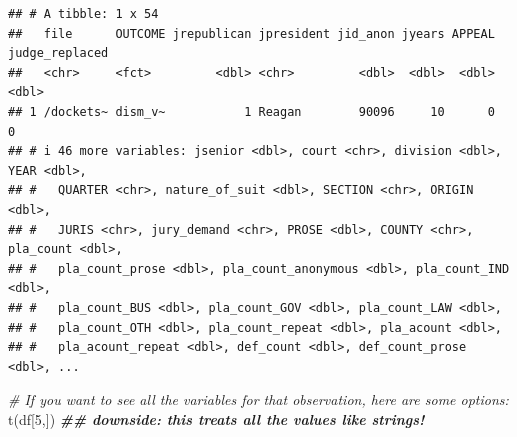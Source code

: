 \documentclass[
]{article}
\newenvironment{Shaded}{\begin{snugshade}}{\end{snugshade}}
\newcommand{\CommentTok}[1]{\textcolor[rgb]{0.56,0.35,0.01}{\textit{#1}}}
\newcommand{\DecValTok}[1]{\textcolor[rgb]{0.00,0.00,0.81}{#1}}
\newcommand{\DocumentationTok}[1]{\textcolor[rgb]{0.56,0.35,0.01}{\textbf{\textit{#1}}}}
\newcommand{\FunctionTok}[1]{\textcolor[rgb]{0.00,0.00,0.00}{#1}}
\newcommand{\NormalTok}[1]{#1}
\begin{document}
\begin{verbatim}
## # A tibble: 1 x 54
##   file      OUTCOME jrepublican jpresident jid_anon jyears APPEAL judge_replaced
##   <chr>     <fct>         <dbl> <chr>         <dbl>  <dbl>  <dbl>          <dbl>
## 1 /dockets~ dism_v~           1 Reagan        90096     10      0              0
## # i 46 more variables: jsenior <dbl>, court <chr>, division <dbl>, YEAR <dbl>,
## #   QUARTER <chr>, nature_of_suit <dbl>, SECTION <chr>, ORIGIN <dbl>,
## #   JURIS <chr>, jury_demand <chr>, PROSE <dbl>, COUNTY <chr>, pla_count <dbl>,
## #   pla_count_prose <dbl>, pla_count_anonymous <dbl>, pla_count_IND <dbl>,
## #   pla_count_BUS <dbl>, pla_count_GOV <dbl>, pla_count_LAW <dbl>,
## #   pla_count_OTH <dbl>, pla_count_repeat <dbl>, pla_acount <dbl>,
## #   pla_acount_repeat <dbl>, def_count <dbl>, def_count_prose <dbl>, ...
\end{verbatim}

\begin{Shaded}
\begin{Highlighting}[]
\CommentTok{\# If you want to see all the variables for that observation, here are some options:}
\FunctionTok{t}\NormalTok{(df[}\DecValTok{5}\NormalTok{,]) }\DocumentationTok{\#\# downside: this treats all the values like strings!}
\end{Highlighting}
\end{Shaded}
\end{document}

